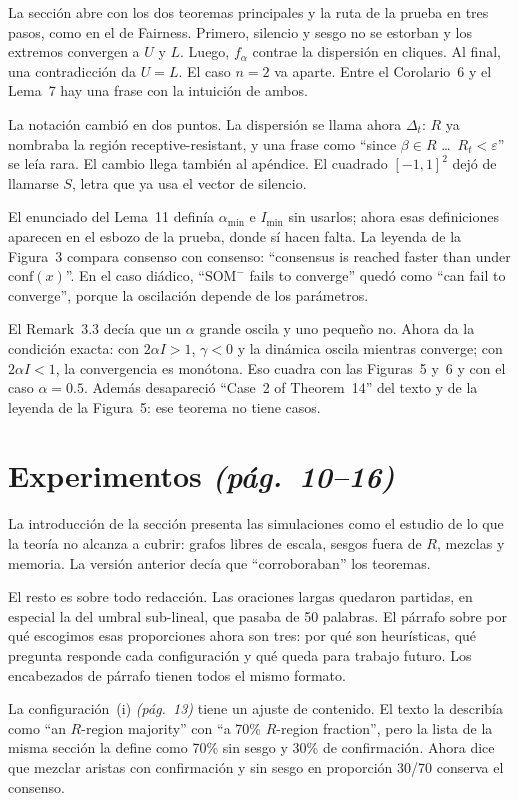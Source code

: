 \documentclass[11pt,a4paper]{article}
\newcommand{\SOMm}{$\mathrm{SOM}^{-}$}
\newcommand{\pag}[1]{\textit{(pág.~#1)}}
\begin{document}
La sección abre con los dos teoremas principales y la ruta de la prueba en tres
pasos, como en el de Fairness. Primero, silencio y sesgo no se estorban y los
extremos convergen a $U$ y $L$. Luego, $f_\alpha$ contrae la dispersión en
cliques. Al final, una contradicción da $U=L$. El caso $n=2$ va aparte. Entre
el Corolario~6 y el Lema~7 hay una frase con la intuición de ambos.

La notación cambió en dos puntos. La dispersión se llama ahora $\Delta_t$: $R$
ya nombraba la región receptive-resistant, y una frase como ``since
$\beta\in R$ \ldots\ $R_t<\varepsilon$'' se leía rara. El cambio llega también
al apéndice. El cuadrado $[-1,1]^2$ dejó de llamarse $S$, letra que ya usa el
vector de silencio.

El enunciado del Lema~11 definía $\alpha_{\min}$ e $I_{\min}$ sin usarlos;
ahora esas definiciones aparecen en el esbozo de la prueba, donde sí hacen
falta. La leyenda de la Figura~3 compara consenso con consenso: ``consensus is
reached faster than under $\mathrm{conf}(x)$''. En el caso diádico, ``\SOMm{}
fails to converge'' quedó como ``can fail to converge'', porque la oscilación
depende de los parámetros.

El Remark~3.3 decía que un $\alpha$ grande oscila y uno pequeño no. Ahora da la
condición exacta: con $2\alpha I>1$, $\gamma<0$ y la dinámica oscila mientras
converge; con $2\alpha I<1$, la convergencia es monótona. Eso cuadra con las
Figuras~5 y~6 y con el caso $\alpha=0.5$. Además desapareció ``Case~2 of
Theorem~14'' del texto y de la leyenda de la Figura~5: ese teorema no tiene
casos.

\section*{Experimentos \pag{10--16}}

La introducción de la sección presenta las simulaciones como el estudio de lo
que la teoría no alcanza a cubrir: grafos libres de escala, sesgos fuera de
$R$, mezclas y memoria. La versión anterior decía que ``corroboraban'' los
teoremas.

El resto es sobre todo redacción. Las oraciones largas quedaron partidas, en
especial la del umbral sub-lineal, que pasaba de 50 palabras. El párrafo sobre
por qué escogimos esas proporciones ahora son tres: por qué son heurísticas,
qué pregunta responde cada configuración y qué queda para trabajo futuro. Los
encabezados de párrafo tienen todos el mismo formato.

La configuración~(i) \pag{13} tiene un ajuste de contenido. El texto la
describía como ``an $R$-region majority'' con ``a 70\% $R$-region fraction'',
pero la lista de la misma sección la define como 70\% sin sesgo y 30\% de
confirmación. Ahora dice que mezclar aristas con confirmación y sin sesgo en
proporción 30/70 conserva el consenso.
\end{document}
